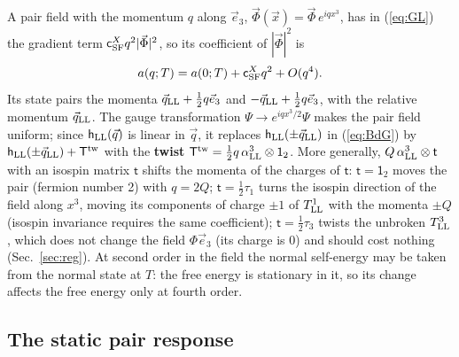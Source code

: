 \documentclass[aps,prd,onecolumn,superscriptaddress,nofootinbib,floatfix,longbibliography]{revtex4-2}
\newcommand{\LL}{{\rm LL}}
\newcommand{\SF}{{\rm SF}}
\begin{document}
A pair field with the momentum $q$ along $\vec e_3$, $\vec\Phi(\vec x)=\vec\Phi\,e^{iqx^3}$, has in (\ref{eq:GL}) the gradient term
$\mathsf c^X_\SF q^2|\vec\Phi|^2$, so its coefficient of $|\vec\Phi|^2$ is
\begin{equation}
a(q;T)=a(0;T)+\mathsf c^X_\SF q^2+O(q^4).
\label{eq:aq}
\end{equation}
Its state pairs the momenta $\vec q_\LL+\frac12q\vec e_3$ and $-\vec q_\LL+\frac12q\vec e_3$, with the relative momentum $\vec q_\LL$. The
gauge transformation $\Psi\to e^{iqx^3/2}\Psi$ makes the pair field uniform; since $\mathsf h_\LL(\vec q)$ is linear in $\vec q$, it replaces
$\mathsf h_\LL(\pm\vec q_\LL)$ in (\ref{eq:BdG}) by $\mathsf h_\LL(\pm\vec q_\LL)+\mathsf T^{\rm tw}$ with the \textbf{twist}
$\mathsf T^{\rm tw}=\frac12q\,\alpha^3_\LL\otimes\mathsf 1_2$. More generally, $Q\,\alpha^3_\LL\otimes\mathsf t$ with an isospin matrix $\mathsf t$ shifts
the momenta of the charges of $\mathsf t$: $\mathsf t=\mathsf 1_2$ moves the pair (fermion number 2) with $q=2Q$; $\mathsf t=\frac12\tau_1$ turns the
isospin direction of the field along $x^3$, moving its components of charge $\pm1$ of $T^1_\LL$ with the momenta $\pm Q$ (isospin
invariance requires the same coefficient); $\mathsf t=\frac12\tau_3$ twists the unbroken $T^3_\LL$, which does not change the field
$\Phi\vec e_3$ (its charge is 0) and should cost nothing (Sec.~\ref{sec:reg}). At second order in the field the normal self-energy
may be taken from the normal state at $T$: the free energy is stationary in it, so its change affects the free energy only at
fourth order.

\subsection{The static pair response}
\end{document}
